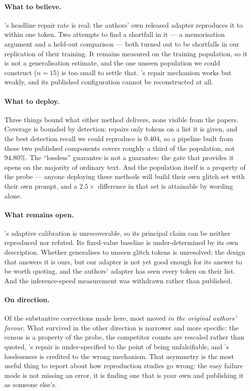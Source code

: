 \paragraph{What to believe.} \gc{}'s headline repair rate is real: the authors'
own released adapter reproduces it to within one token. Two attempts to find a
shortfall in it --- a memorisation argument and a held-out comparison --- both
turned out to be shortfalls in our replication of their training. It remains
measured on the training population, so it is not a generalisation estimate, and
the one unseen population we could construct ($n = 15$) is too small to settle
that. \gp{}'s repair mechanism works but weakly, and its published configuration
cannot be reconstructed at all.

\paragraph{What to deploy.} Three things bound what either method delivers, none
visible from the papers. Coverage is bounded by detection: \gc{} repairs only
tokens on a list it is given, and the best detection recall we could reproduce is
$0.404$, so a pipeline built from these two published components covers roughly a
third of the population, not $94.80\%$. The ``lossless'' guarantee is not a
guarantee: the gate that provides it opens on the majority of ordinary text.
And the population itself is a property of the probe --- anyone deploying these
methods will build their own glitch set with their own prompt, and a $2.5\times$
difference in that set is attainable by wording alone.

\paragraph{What remains open.} \gp{}'s adaptive calibration is unrecoverable, so
its principal claim can be neither reproduced nor refuted. Its fixed-value
baseline is under-determined by its own description. Whether \gc{} generalises to
unseen glitch tokens is unresolved: the design that answers it is ours, but our
adapter is not yet good enough for its answer to be worth quoting, and the
authors' adapter has seen every token on their list. And the inference-speed
measurement was withdrawn rather than published.

\paragraph{On direction.} Of the substantive corrections made here, most moved
\emph{in the original authors' favour}. What survived in the other direction is
narrower and more specific: the census is a property of the probe, the competitor
counts are rescaled rather than quoted, \gp{}'s repair is under-specified to the
point of being unfalsifiable, and \gc{}'s losslessness is credited to the wrong
mechanism. That asymmetry is the most useful thing to report about how
reproduction studies go wrong: the easy failure mode is not missing an error, it
is finding one that is your own and publishing it as someone else's.


